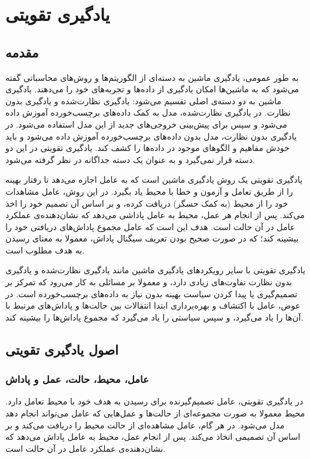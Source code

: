 \chapter{ یادگیری تقویتی}
\section{مقدمه}
به طور عمومی، یادگیری ماشین به دسته‌ای از الگوریتم‌ها و روش‌های محاسباتی گفته می‌شود که به ماشین‌ها امکان یادگیری از داده‌ها و تجربه‌های خود را می‌دهند.
یادگیری ماشین به دو دسته‌ی اصلی تقسیم می‌شود: یادگیری نظارت‌شده
 و یادگیری بدون نظارت.
در یادگیری نظارت‌شده، مدل به کمک داده‌های برچسب‌خورده آموزش داده می‌شود و سپس برای پیش‌بینی خروجی‌های جدید از این مدل استفاده می‌شود.
در یادگیری بدون نظارت، مدل بدون داده‌های برچسب‌خورده آموزش داده می‌شود و باید خودش مفاهیم و الگوهای موجود در داده‌ها را کشف کند.
یادگیری تقویتی در این دو دسته قرار نمی‌گیرد و به عنوان یک دسته جداگانه در نظر گرفته می‌شود.

یادگیری تقویتی یک روش یادگیری ماشین است که به عامل اجازه می‌دهد تا رفتار بهینه را از طریق تعامل و آزمون و خطا با محیط یاد بگیرد.
در این روش، عامل مشاهدات خود را از محیط (به کمک حسگر)
دریافت کرده،
و بر اساس آن تصمیم خود را اخذ می‌کند.
پس از انجام هر عمل، محیط به عامل پاداشی می‌دهد که نشان‌دهنده‌ی عملکرد عامل در آن حالت است.
هدف این است که عامل مجموع پاداش‌های دریافتی خود را بیشینه کند؛ که در صورت صحیح بودن تعریف سیگنال پاداش، معمولا به معنای رسیدن به هدف مطلوب است.

یادگیری تقویتی با سایر رویکرد‌های یادگیری ماشین مانند یادگیری نظارت‌شده و یادگیری بدون نظارت تفاوت‌های زیادی دارد، 
و معمولا بر مسائلی به کار می‌رود که تمرکز بر تصمیم‌گیری یا پیدا کردن سیاست بهینه بدون نیاز به داده‌های برچسب‌خورده است.
در عوض، عامل با اکتشاف و بهره‌برداری ابتدا انتقالات بین حالت‌ها و پاداش‌های مرتبط با آن‌ها را یاد می‌گیرد، و سپس سیاستی را یاد می‌گیرد که مجموع پاداش‌ها را بیشینه کند.


\section{اصول یادگیری تقویتی}
\subsection{عامل، محیط، حالت، عمل و پاداش}
در یادگیری تقویتی، عامل
 تصمیم‌گیرنده برای رسیدن به هدف خود با محیط
  تعامل دارد.
محیط معمولا به صورت مجموعه‌ای از حالت‌ها
  و عمل‌هایی
    که عامل می‌تواند انجام دهد مدل می‌شود.
در هر گام، عامل مشاهده‌ای از حالت محیط را دریافت می‌کند و بر اساس آن تصمیمی اتخاذ می‌کند.
پس از انجام عمل، محیط به عامل پاداش
  می‌دهد که نشان‌دهنده‌ی عملکرد عامل در آن حالت است.

